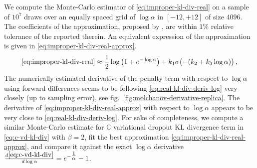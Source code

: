 \documentclass[a4paper,10pt,twocolumn]{article}
\newcommand{\cplx}{\mathbb{C}}
\begin{document}
We compute the Monte-Carlo estimator of \eqref{eq:improper-kl-div-real} on a sample of $10^7$
draws over an equally spaced grid of $\log \alpha$ in $[-12, +12]$ of size $4096$. The
coefficients of the approximation, proposed by \citet{molchanov_variational_2017}, are
within $1\%$ relative tolerance of the reported therein. An equivalent expression of the
approximation is given in \eqref{eq:improper-kl-div-real-approx}.
\begin{equation}  \label{eq:improper-kl-div-real-approx}
  \eqref{eq:improper-kl-div-real}
  \approx
    \frac12 \log{\bigl(1 + e^{-\log \alpha}\bigr)}
    + k_1 \sigma\bigl(- (k_2 + k_3 \log \alpha)\bigr)
  \,,
\end{equation}
The numerically estimated derivative of the penalty term with respect to $\log \alpha$ using
forward differences seems to be following \eqref{eq:real-kl-div-deriv-log} very closely (up to
sampling error), see fig.~\ref{fig:molchanov-derivative-replica}. The derivative of
\eqref{eq:improper-kl-div-real-approx} with respect to $\log \alpha$ appears to be very
close to \eqref{eq:real-kl-div-deriv-log}. For sake of completeness, we compute a similar
Monte-Carlo estimate for $\cplx$ variational dropout KL divergence term in \eqref{eq:c-vd-kl-div}
with $\beta = 2$, fit the best approximation \eqref{eq:improper-kl-div-real-approx}, and
compare it against the exact $\log \alpha$ derivative $
  \frac{d \eqref{eq:c-vd-kl-div}}{d\log \alpha}
    = e^{-\tfrac1\alpha} - 1
$.
\end{document}
